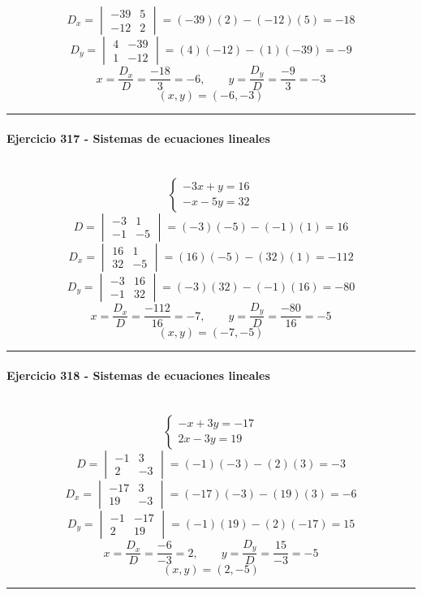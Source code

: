 \documentclass[10pt,a4paper]{article}
\newcommand{\res}[1]{\paragraph{#1}\mbox{}\\[-1.2em]}
\begin{document}
\[ D_x=\begin{vmatrix}-39&5\\-12&2\end{vmatrix}=(-39)(2)-(-12)(5)=-18 \]
\[ D_y=\begin{vmatrix}4&-39\\1&-12\end{vmatrix}=(4)(-12)-(1)(-39)=-9 \]
\[ x=\frac{D_x}{D}=\frac{-18}{3}=-6,\qquad y=\frac{D_y}{D}=\frac{-9}{3}=-3 \]
\[ \boxed{(x,y)=(-6,-3)} \]
\vspace{1mm}\hrule\vspace{2mm}
\res{Ejercicio 317 - Sistemas de ecuaciones lineales}
\[ \begin{cases}- 3 x + y=16\\- x - 5 y=32\end{cases} \]
\[ D=\begin{vmatrix}-3&1\\-1&-5\end{vmatrix}=(-3)(-5)-(-1)(1)=16 \]
\[ D_x=\begin{vmatrix}16&1\\32&-5\end{vmatrix}=(16)(-5)-(32)(1)=-112 \]
\[ D_y=\begin{vmatrix}-3&16\\-1&32\end{vmatrix}=(-3)(32)-(-1)(16)=-80 \]
\[ x=\frac{D_x}{D}=\frac{-112}{16}=-7,\qquad y=\frac{D_y}{D}=\frac{-80}{16}=-5 \]
\[ \boxed{(x,y)=(-7,-5)} \]
\vspace{1mm}\hrule\vspace{2mm}
\res{Ejercicio 318 - Sistemas de ecuaciones lineales}
\[ \begin{cases}- x + 3 y=-17\\2 x - 3 y=19\end{cases} \]
\[ D=\begin{vmatrix}-1&3\\2&-3\end{vmatrix}=(-1)(-3)-(2)(3)=-3 \]
\[ D_x=\begin{vmatrix}-17&3\\19&-3\end{vmatrix}=(-17)(-3)-(19)(3)=-6 \]
\[ D_y=\begin{vmatrix}-1&-17\\2&19\end{vmatrix}=(-1)(19)-(2)(-17)=15 \]
\[ x=\frac{D_x}{D}=\frac{-6}{-3}=2,\qquad y=\frac{D_y}{D}=\frac{15}{-3}=-5 \]
\[ \boxed{(x,y)=(2,-5)} \]
\vspace{1mm}\hrule\vspace{2mm}
\end{document}
